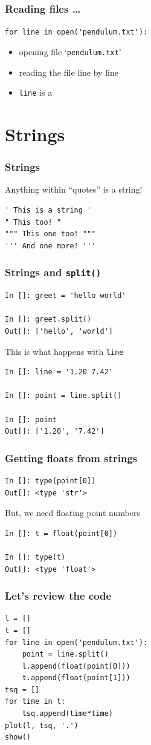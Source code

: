 \documentclass[14pt,compress]{beamer}
\newcounter{time}
\newcommand{\typ}[1]{\lstinline{#1}}
\newcommand{\kwrd}[1]{ \texttt{\textbf{\color{blue}{#1}}}  }
\begin{document}
\begin{frame}[fragile]
  \frametitle{Reading files \ldots}
\typ{for line in open('pendulum.txt'):}
\begin{itemize}
\item opening file `\typ{pendulum.txt}'
\item reading the file line by line
\item \typ{line} is a \kwrd{string}
\end{itemize}
\end{frame}

\section{Strings}
\begin{frame}[fragile]
\frametitle{Strings}
Anything within ``quotes'' is a string!
\begin{lstlisting}
' This is a string '  
" This too! "
""" This one too! """
''' And one more! '''
\end{lstlisting}
\end{frame}

\begin{frame}[fragile]
\frametitle{Strings and \typ{split()}}
  \begin{lstlisting}
In []: greet = 'hello world'

In []: greet.split()
Out[]: ['hello', 'world']
  \end{lstlisting}
This is what happens with \typ{line}
  \begin{lstlisting}
In []: line = '1.20 7.42'

In []: point = line.split()

In []: point
Out[]: ['1.20', '7.42']
  \end{lstlisting}
\end{frame}

\begin{frame}[fragile]
\frametitle{Getting floats from strings}
  \begin{lstlisting}
In []: type(point[0])
Out[]: <type 'str'>
  \end{lstlisting}
But, we need floating point numbers
  \begin{lstlisting}
In []: t = float(point[0])

In []: type(t)
Out[]: <type 'float'>
  \end{lstlisting}
\end{frame}

\begin{frame}[fragile]
\frametitle{Let's review the code}
\begin{lstlisting}
l = []
t = []
for line in open('pendulum.txt'):
    point = line.split()
    l.append(float(point[0]))
    t.append(float(point[1]))
tsq = []
for time in t:
    tsq.append(time*time)
plot(l, tsq, '.')
show()
\end{lstlisting}
\end{frame}
\end{document}
